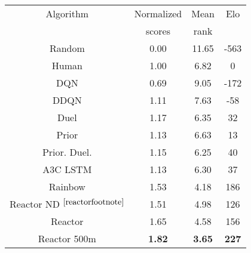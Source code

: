 \begin{tabular}{| c | c | c | c |}
\hline
Algorithm & Normalized & Mean& Elo \\
 & scores & rank &\\
\hline
Random & 0.00 & 11.65 & -563\\
Human & 1.00 & 6.82 & 0\\
DQN & 0.69 & 9.05 & -172\\
DDQN & 1.11 & 7.63 & -58\\
Duel & 1.17 & 6.35 & 32\\
Prior & 1.13 & 6.63 & 13\\
Prior. Duel. & 1.15 & 6.25 & 40\\
A3C LSTM & 1.13 & 6.30 & 37\\
Rainbow & 1.53 & 4.18 & 186\\
Reactor ND $^{\ref{reactorfootnote}}$ & 1.51 & 4.98 & 126\\
Reactor & 1.65 & 4.58 & 156\\
Reactor 500m & {\bf 1.82} & {\bf 3.65} & {\bf 227}\\
\hline
\end{tabular}
